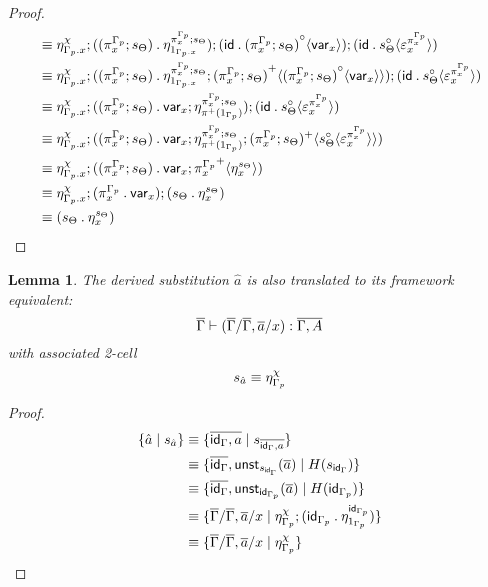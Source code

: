 \documentclass[10pt]{article}
\newtheorem{lemma}{Lemma}
\theoremstyle{definition}
\newcommand{\yields}{\vdash}
\newcommand\UnSt[2]{\ensuremath{\mathsf{unst}_{#1}(#2)}}
\newcommand\TrPlus[2]{\ensuremath{{#1}^+(#2)}}
\newcommand\var[1]{\ensuremath{\mathsf{var}_{#1}}}
\newcommand{\id}{\mathsf{id}}
\newcommand\ap[2]{\ensuremath{#1 \langle #2 \rangle }}
\newcommand\bdot[0]{\mathbin{.}}
\begin{document}
\begin{proof}
\begin{align*}
&\equiv \eta^\chi_{\asdep{\Gamma}.x} ; ((\pi^{\asdep{\Gamma}}_x;s_\Theta) \bdot \eta^{\pi^{\asdep{\Gamma}}_x;s_\Theta}_{1_{\asdep{\Gamma}.x}}) ; (\id \bdot \ap{{(\pi^{\asdep{\Gamma}}_x;s_\Theta)}^\circ}{\var{x}}) ; (\id \bdot \ap{s_\Theta^\circ}{\varepsilon^{\pi^{\asdep{\Gamma}}_x}_x}) \\
&\equiv \eta^\chi_{\asdep{\Gamma}.x} ; ((\pi^{\asdep{\Gamma}}_x;s_\Theta) \bdot \eta^{\pi^{\asdep{\Gamma}}_x;s_\Theta}_{1_{\asdep{\Gamma}.x}} ; \ap{{(\pi^{\asdep{\Gamma}}_x;s_\Theta)}^+}{\ap{{(\pi^{\asdep{\Gamma}}_x;s_\Theta)}^\circ}{\var{x}}})  ; (\id \bdot \ap{s_\Theta^\circ}{\varepsilon^{\pi^{\asdep{\Gamma}}_x}_x}) \\
&\equiv \eta^\chi_{\asdep{\Gamma}.x} ; ((\pi^{\asdep{\Gamma}}_x;s_\Theta) \bdot \var{x};\eta^{\pi^{\asdep{\Gamma}}_x;s_\Theta}_{\TrPlus{\pi}{1_{\asdep{\Gamma}}}})  ; (\id \bdot \ap{s_\Theta^\circ}{\varepsilon^{\pi^{\asdep{\Gamma}}_x}_x}) \\
&\equiv \eta^\chi_{\asdep{\Gamma}.x} ; ((\pi^{\asdep{\Gamma}}_x;s_\Theta) \bdot \var{x};\eta^{\pi^{\asdep{\Gamma}}_x;s_\Theta}_{\TrPlus{\pi}{1_{\asdep{\Gamma}}}};\ap{(\pi^{\asdep{\Gamma}}_x;s_\Theta)^+}{\ap{s_\Theta^\circ}{\varepsilon^{\pi^{\asdep{\Gamma}}_x}_x}}) \\
&\equiv \eta^\chi_{\asdep{\Gamma}.x} ; ((\pi^{\asdep{\Gamma}}_x;s_\Theta) \bdot \var{x};\ap{{\pi^{\asdep{\Gamma}}_x}^+}{\eta^{s_\Theta}_x}) \\
&\equiv \eta^\chi_{\asdep{\Gamma}.x} ; (\pi^{\asdep{\Gamma}}_x \bdot \var{x}) ; (s_\Theta \bdot \eta^{s_\Theta}_x) \\
&\equiv (s_\Theta \bdot \eta^{s_\Theta}_x) \\
\end{align*}
\end{proof}

\begin{lemma}
The derived substitution $\hat{a}$ is also translated to its framework equivalent: \[\upstairs{\Gamma} \yields (\upstairs{\Gamma}/\upstairs{\Gamma}, \upstairs{a}/x) : \upstairs{\Gamma, A} \]
with associated 2-cell \[s_{\hat{a}} \equiv \eta^\chi_{{\Gamma}_p} \]
\end{lemma}
\begin{proof}
\begin{align*}
\{ \hat{a} \mid s_{\hat{a}} \}
&\equiv \{ \upstairs{\id_\Gamma, a} \mid s_{\upstairs{\id_\Gamma, a}} \} \\
&\equiv \{ \upstairs{\id_\Gamma}, \UnSt{s_{\id_\Gamma}}{\upstairs{a}} \mid H(s_{\id_\Gamma})\} \\
&\equiv \{ \upstairs{\id_\Gamma}, \UnSt{\id_{\asdep\Gamma}}{\upstairs{a}} \mid H(\id_{\asdep\Gamma}) \} \\
&\equiv \{ \upstairs{\Gamma}/\upstairs{\Gamma}, \upstairs{a}/x \mid \eta^\chi_{\asdep{\Gamma}}; (\id_{\asdep\Gamma} \bdot \eta_{1_{\asdep{\Gamma}}}^{\id_{\asdep\Gamma}}) \} \\
&\equiv \{ \upstairs{\Gamma}/\upstairs{\Gamma}, \upstairs{a}/x \mid \eta^\chi_{\asdep{\Gamma}} \}
\end{align*}
\end{proof}
\end{document}
